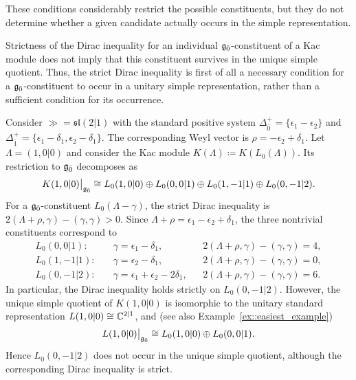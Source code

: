 These conditions considerably restrict the possible constituents, but they do not determine whether a given candidate actually occurs in the simple representation.

\begin{remark}\label{rmk::Dirac_inequality_not_enough}
Strictness of the Dirac inequality for an individual ${\mathfrak{g}_{\bar{0}}}$-constituent of a Kac module does not imply that this constituent survives in the unique simple quotient. Thus, the strict Dirac inequality is first of all a necessary condition for a ${\mathfrak{g}_{\bar{0}}}$-constituent to occur in a unitary simple representation, rather than a sufficient condition for its occurrence.

Consider $\gg=\mathfrak{sl}(2\vert 1)$ with the standard positive system $\Delta_{\bar0}^{+}=\{\epsilon_1-\epsilon_2\}$ and $\Delta_{\bar1}^{+}=\{\epsilon_1-\delta_1,\epsilon_2-\delta_1\}$. The corresponding Weyl vector is $\rho=-\epsilon_2+\delta_1$. Let $\Lambda=(1,0\vert0)$ and consider the Kac module $K(\Lambda)\coloneqq K(L_{0}(\Lambda))$. Its restriction to ${\mathfrak{g}_{\bar{0}}}$ decomposes as
\begin{equation*}
K(1,0\vert0)\big\vert_{{\mathfrak{g}_{\bar{0}}}}
\cong
L_0(1,0\vert0)
\oplus
L_0(0,0\vert1)
\oplus
L_0(1,-1\vert1)
\oplus
L_0(0,-1\vert2).
\end{equation*}
For a ${\mathfrak{g}_{\bar{0}}}$-constituent $L_0(\Lambda-\gamma)$, the strict Dirac inequality is $2(\Lambda+\rho,\gamma)-(\gamma,\gamma)>0$. Since $\Lambda+\rho=\epsilon_1-\epsilon_2+\delta_1$, the three nontrivial constituents correspond to
\begin{equation*}
\begin{aligned}
L_0(0,0\vert1):\quad
&\gamma=\epsilon_1-\delta_1,
&&2(\Lambda+\rho,\gamma)-(\gamma,\gamma)=4,\\
L_0(1,-1\vert1):\quad
&\gamma=\epsilon_2-\delta_1,
&&2(\Lambda+\rho,\gamma)-(\gamma,\gamma)=0,\\
L_0(0,-1\vert2):\quad
&\gamma=\epsilon_1+\epsilon_2-2\delta_1,
&&2(\Lambda+\rho,\gamma)-(\gamma,\gamma)=6.
\end{aligned}
\end{equation*}
In particular, the Dirac inequality holds strictly on $L_0(0,-1\vert2)$. However, the unique simple quotient of $K(1,0\vert0)$ is isomorphic to the unitary standard representation $L(1,0\vert0)\cong{\mathbb C}^{2\vert1}$, and (see also Example~\ref{ex::easiest_example})
\begin{equation*}
L(1,0\vert0)\big\vert_{{\mathfrak{g}_{\bar{0}}}}
\cong
L_0(1,0\vert0)\oplus L_0(0,0\vert1).
\end{equation*}
Hence $L_0(0,-1\vert2)$ does not occur in the unique simple quotient, although the corresponding Dirac inequality is strict.
\end{remark}


